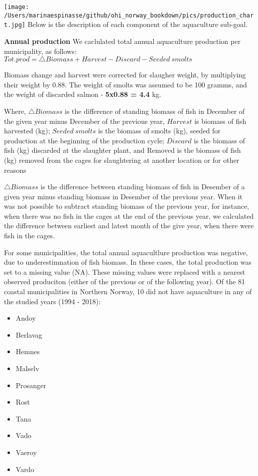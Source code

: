 \documentclass[
]{book}
\providecommand{\tightlist}{%
  \setlength{\itemsep}{0pt}\setlength{\parskip}{0pt}}
\begin{document}
\texttt{[image: /Users/marinaespinasse/github/ohi\_norway\_bookdown/pics/production\_chart.jpg]}
Below is the description of each component of the aquaculture sub-goal.

\textbf{Annual production}
We caclulated total annual aquaculture production per municipality, as follows:
\(Tot.prod = \triangle Biomass + Harvest - Discard - Seeded\ smolts\)

Biomass change and harvest were corrected for slaugher weight, by multiplying their weight by 0.88.
The weight of smolts was assumed to be 100 gramms, and the weight of discarded salmon - \textbf{5x0.88 = 4.4} kg.

Where, \(\triangle Biomass\) is the difference of standing biomass of fish in December of the given year minus December of the previous year, \(Harvest\) is biomass of fish harvested (kg); \(Seeded\ smolts\) is the biomass of smolts (kg), seeded for production at the beginning of the production cycle; \(Discard\) is the biomass of fish (kg) discarded at the slaughter plant, and Removed is the biomass of fish (kg) removed from the cages for slaughtering at another location or for other reasons

\(\triangle Biomass\) is the difference between standing biomass of fish in Desember of a given year minus standing biomass in Desember of the previous year. When it was not possible to subtract standing biomass of the previous year, for instance, when there was no fish in the cages at the end of the previous year, we calculated the difference between earliest and latest month of the give year, when there were fish in the cages.

For some municipalities, the total annual aquacultlure production was negative, due to underestimnation of fish biomass. In these cases, the total production was set to a missing value (NA). These missing values were replaced with a nearest observed produciton (either of the previous or of the following year).
Of the 81 coastal municipalities in Northern Norway, 10 did not have aquaculture in any of the studied years (1994 - 2018):

\begin{itemize}
\tightlist
\item
  Andoy
\item
  Berlavag
\item
  Hemnes
\item
  Malselv
\item
  Prosanger
\item
  Rost
\item
  Tana
\item
  Vado
\item
  Vaeroy
\item
  Vardo
\end{itemize}
\end{document}
